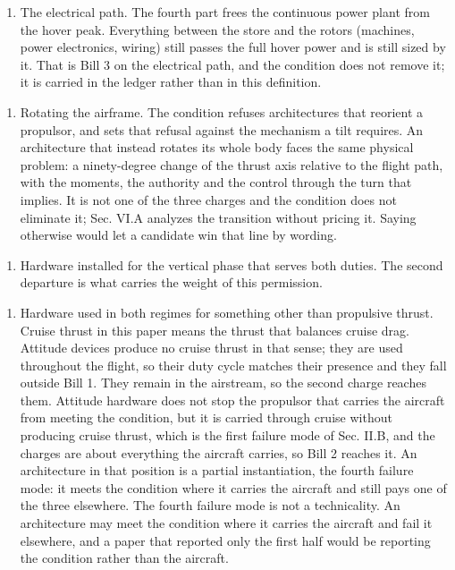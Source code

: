 \documentclass[journal]{new-aiaa}
\begin{document}
\begin{enumerate}[label=\arabic*)]
\item The electrical path. The fourth part frees the continuous power plant from the hover peak. Everything between the store and the rotors (machines, power electronics, wiring) still passes the full hover power and is still sized by it. That is Bill 3 on the electrical path, and the condition does not remove it; it is carried in the ledger rather than in this definition.
\end{enumerate}

\begin{enumerate}[label=\arabic*)]
\item Rotating the airframe. The condition refuses architectures that reorient a propulsor, and sets that refusal against the mechanism a tilt requires. An architecture that instead rotates its whole body faces the same physical problem: a ninety-degree change of the thrust axis relative to the flight path, with the moments, the authority and the control through the turn that implies. It is not one of the three charges and the condition does not eliminate it; Sec. VI.A analyzes the transition without pricing it. Saying otherwise would let a candidate win that line by wording.
\end{enumerate}

\begin{enumerate}[label=\arabic*)]
\item Hardware installed for the vertical phase that serves both duties. The second departure is what carries the weight of this permission.
\end{enumerate}

\begin{enumerate}[label=\arabic*)]
\item Hardware used in both regimes for something other than propulsive thrust. Cruise thrust in this paper means the thrust that balances cruise drag. Attitude devices produce no cruise thrust in that sense; they are used throughout the flight, so their duty cycle matches their presence and they fall outside Bill 1. They remain in the airstream, so the second charge reaches them. Attitude hardware does not stop the propulsor that carries the aircraft from meeting the condition, but it is carried through cruise without producing cruise thrust, which is the first failure mode of Sec. II.B, and the charges are about everything the aircraft carries, so Bill 2 reaches it. An architecture in that position is a partial instantiation, the fourth failure mode: it meets the condition where it carries the aircraft and still pays one of the three elsewhere. The fourth failure mode is not a technicality. An architecture may meet the condition where it carries the aircraft and fail it elsewhere, and a paper that reported only the first half would be reporting the condition rather than the aircraft.
\end{enumerate}
\end{document}
